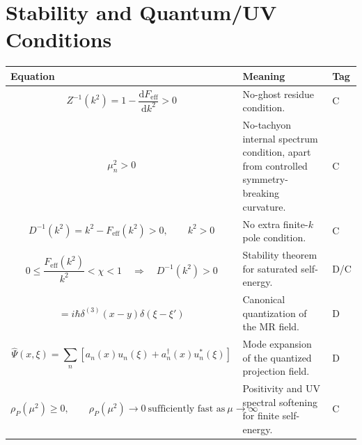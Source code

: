 \documentclass[11pt]{article}
\newcommand{\eff}{\mathrm{eff}}
\newcommand{\dd}{\mathrm{d}}
\begin{document}
\section{Stability and Quantum/UV Conditions}
\begin{longtable}{>{\raggedright\arraybackslash}p{} >{\raggedright\arraybackslash}p{} >{\centering\arraybackslash}p{}}
\toprule
\textbf{Equation} & \textbf{Meaning} & \textbf{Tag} \\
\midrule
\endhead

\begin{equation}
Z^{-1}(k^2)=1-\frac{\dd F_{\eff}}{\dd k^2}>0
\end{equation}
& No-ghost residue condition. & C \\

\begin{equation}
\mu_n^2>0
\end{equation}
& No-tachyon internal spectrum condition, apart from controlled symmetry-breaking curvature. & C \\

\begin{equation}
D^{-1}(k^2)=k^2-F_{\eff}(k^2)>0,\qquad k^2>0
\end{equation}
& No extra finite-$k$ pole condition. & C \\

\begin{equation}
0\le \frac{F_{\eff}(k^2)}{k^2}<\chi<1\quad\Rightarrow\quad D^{-1}(k^2)>0
\end{equation}
& Stability theorem for saturated self-energy. & D/C \\

\begin{equation}
[\hat\Psi(x,\xi),\hat\Pi_\Psi(y,\xi')]=i\hbar\delta^{(3)}(x-y)\delta(\xi-\xi')
\end{equation}
& Canonical quantization of the MR field. & D \\

\begin{equation}
\hat\Psi(x,\xi)=\sum_n\left[a_n(x)u_n(\xi)+a_n^\dagger(x)u_n^*(\xi)\right]
\end{equation}
& Mode expansion of the quantized projection field. & D \\

\begin{equation}
\rho_P(\mu^2)\ge0,
\qquad
\rho_P(\mu^2)\rightarrow0\ \text{sufficiently fast as}\ \mu\rightarrow\infty
\end{equation}
& Positivity and UV spectral softening for finite self-energy. & C \\

\bottomrule
\end{longtable}
\end{document}
